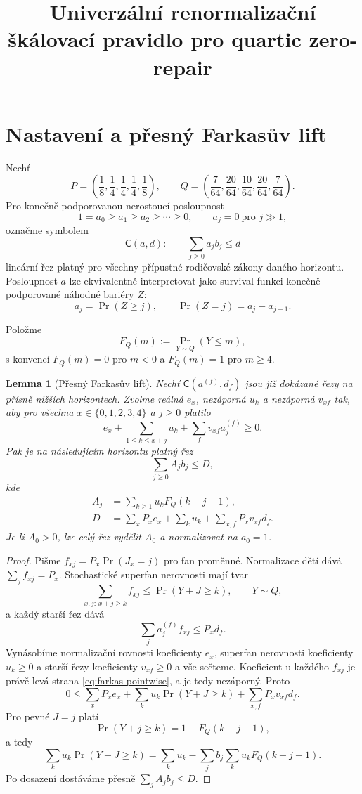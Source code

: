 \documentclass[11pt,a4paper]{article}
\title{Univerzální renormalizační škálovací pravidlo pro quartic zero-repair}
\author{}
\date{}
\newtheorem{lemma}[theorem]{Lemma}
\theoremstyle{remark}
\newcommand{\FQ}{F_Q}
\begin{document}
\maketitle

\section{Nastavení a přesný Farkasův lift}

Nechť
\[
P=\left(\frac18,\frac14,\frac14,\frac14,\frac18\right),
\qquad
Q=\left(\frac7{64},\frac{20}{64},\frac{10}{64},\frac{20}{64},\frac7{64}\right).
\]
Pro konečně podporovanou nerostoucí posloupnost
\[
1=a_0\ge a_1\ge a_2\ge\cdots\ge0,
\qquad a_j=0\ \text{pro }j\gg1,
\]
označme symbolem
\[
\mathsf C(a,d):\qquad \sum_{j\ge0}a_j b_j\le d
\]
lineární řez platný pro všechny přípustné rodičovské zákony daného horizontu.
Posloupnost $a$ lze ekvivalentně interpretovat jako survival funkci konečně
podporované náhodné bariéry $Z$:
\[
a_j=\Pr(Z\ge j),\qquad
\Pr(Z=j)=a_j-a_{j+1}.
\]

Položme
\[
\FQ(m):=\Pr_{Y\sim Q}(Y\le m),
\]
s konvencí $\FQ(m)=0$ pro $m<0$ a $\FQ(m)=1$ pro $m\ge4$.

\begin{lemma}[Přesný Farkasův lift]\label{lem:farkas}
Nechť $\mathsf C(a^{(f)},d_f)$ jsou již dokázané řezy na přísně nižších
horizontech. Zvolme reálná $e_x$, nezáporná $u_k$ a nezáporná $v_{xf}$ tak,
aby pro všechna $x\in\{0,1,2,3,4\}$ a $j\ge0$ platilo
\begin{equation}\label{eq:farkas-pointwise}
 e_x+\sum_{1\le k\le x+j}u_k
 +\sum_f v_{xf}a^{(f)}_j\ge0.
\end{equation}
Pak je na následujícím horizontu platný řez
\[
\sum_{j\ge0}A_j b_j\le D,
\]
kde
\begin{align}
A_j&=\sum_{k\ge1}u_k\FQ(k-j-1),\label{eq:Afromu}\\
D&=\sum_xP_xe_x+\sum_ku_k+\sum_{x,f}P_xv_{xf}d_f.\label{eq:Dfromdual}
\end{align}
Je-li $A_0>0$, lze celý řez vydělit $A_0$ a normalizovat na $a_0=1$.
\end{lemma}

\begin{proof}
Pišme $f_{xj}=P_x\Pr(J_x=j)$ pro fan proměnné. Normalizace dětí dává
$\sum_jf_{xj}=P_x$. Stochastické superfan nerovnosti mají tvar
\[
\sum_{x,j:\,x+j\ge k}f_{xj}
\le \Pr(Y+J\ge k),
\qquad Y\sim Q,
\]
a každý starší řez dává
\[
\sum_j a^{(f)}_j f_{xj}\le P_xd_f.
\]
Vynásobíme normalizační rovnosti koeficienty $e_x$, superfan nerovnosti
koeficienty $u_k\ge0$ a starší řezy koeficienty $v_{xf}\ge0$ a vše sečteme.
Koeficient u každého $f_{xj}$ je právě levá strana
\eqref{eq:farkas-pointwise}, a je tedy nezáporný. Proto
\[
0\le
\sum_xP_xe_x+\sum_k u_k\Pr(Y+J\ge k)
+\sum_{x,f}P_xv_{xf}d_f.
\]
Pro pevné $J=j$ platí
\[
\Pr(Y+j\ge k)=1-\FQ(k-j-1),
\]
a tedy
\[
\sum_ku_k\Pr(Y+J\ge k)
=
\sum_ku_k-\sum_jb_j\sum_ku_k\FQ(k-j-1).
\]
Po dosazení dostáváme přesně $\sum_jA_jb_j\le D$.
\end{proof}
\end{document}
